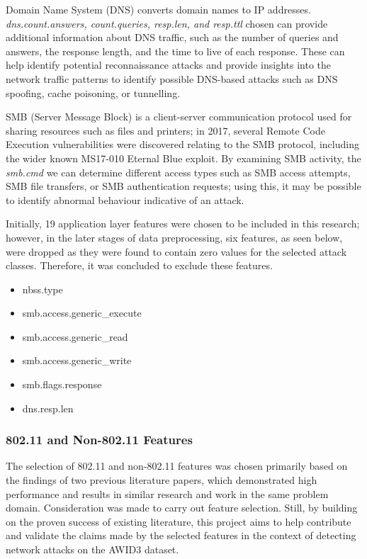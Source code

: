 \medskip
Domain Name System (DNS) converts domain names to IP addresses. \textit{dns.count.answers, count.queries, resp.len, and resp.ttl} chosen can provide additional information about DNS traffic, such as the number of queries and answers, the response length, and the time to live of each response. These can help identify potential reconnaissance attacks and provide insights into the network traffic patterns to identify possible DNS-based attacks such as DNS spoofing, cache poisoning, or tunnelling.

\medskip
SMB (Server Message Block) is a client-server communication protocol used for sharing resources such as files and printers; in 2017, several Remote Code Execution vulnerabilities were discovered relating to the SMB protocol, including the wider known MS17-010 Eternal Blue exploit. By examining SMB activity, the \textit{smb.cmd} we can determine different access types such as SMB access attempts, SMB file transfers, or SMB authentication requests; using this, it may be possible to identify abnormal behaviour indicative of an attack. 

Initially, 19 application layer features were chosen to be included in this research; however, in the later stages of data preprocessing, six features, as seen below, were dropped as they were found to contain zero values for the selected attack classes. Therefore, it was concluded to exclude these features. 

\begin{itemize}
	\item nbss.type
	\item smb.access.generic\_execute
	\item smb.access.generic\_read
	\item smb.access.generic\_write
	\item smb.flags.response
	\item dns.resp.len
\end{itemize}


\subsubsection{802.11 and Non-802.11 Features}

The selection of 802.11 and non-802.11 features was chosen primarily based on the findings of two previous literature papers, \parencite{pick_quality_over, s22155633} which demonstrated high performance and results in similar research and work in the same problem domain. Consideration was made to carry out feature selection. Still, by building on the proven success of existing literature, this project aims to help contribute and validate the claims made by the selected features in the context of detecting network attacks on the AWID3 dataset. 

